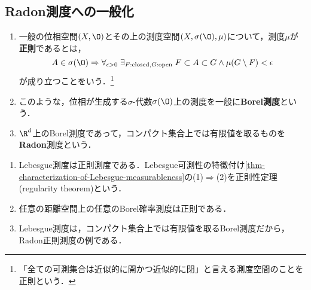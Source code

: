 \documentclass[uplatex, dvipdfmx]{jsreport}
\begin{document}
\subsection{Radon測度への一般化}

\begin{definition}\mbox{}
    \begin{enumerate}
        \item 一般の位相空間$(X,\O)$とその上の測度空間$(X,\sigma(\O),\mu)$について，測度$\mu$が\textbf{正則}であるとは，\[A\in\sigma(\O)\Rightarrow\forall_{\epsilon>0}\;\exists_{F:\mathrm{closed},G:\mathrm{open}}\;F\subset A\subset G\land\mu(G\setminus F)<\epsilon\]が成り立つことをいう．\footnote{「全ての可測集合は近似的に開かつ近似的に閉」と言える測度空間のことを正則という．}
        \item このような，位相が生成する$\sigma$-代数$\sigma(\O)$上の測度を一般に\textbf{Borel測度}という．
        \item $\R^d$上のBorel測度であって，コンパクト集合上では有限値を取るものを\textbf{Radon}測度という．
    \end{enumerate}
\end{definition}
\begin{example}\mbox{}
    \begin{enumerate}
        \item Lebesgue測度は正則測度である．Lebesgue可測性の特徴付け\ref{thm-characterization-of-Lebesgue-measurableness}の(1)$\Rightarrow$(2)を正則性定理(regularity theorem)という．
        \item 任意の距離空間上の任意のBorel確率測度は正則である．
        \item Lebesgue測度は，コンパクト集合上では有限値を取るBorel測度だから，Radon正則測度の例である．
    \end{enumerate}
\end{example}
\end{document}
